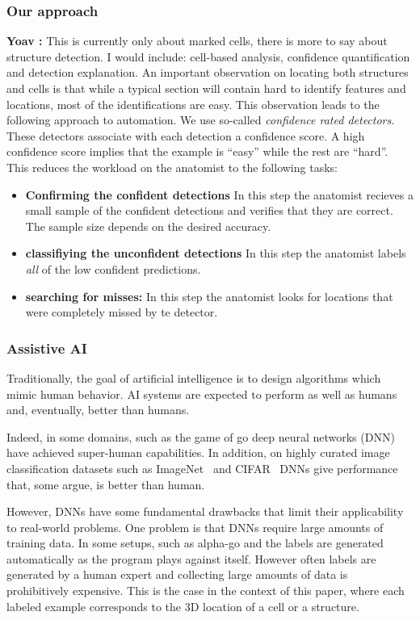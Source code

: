 \documentclass[11pt]{article}
\newcommand{\comment}[3]{{\color{#1} {\bf #2 :} #3}}
\newcommand{\yoav}[1]{\comment{purple}{Yoav}{#1}}
\begin{document}
\subsubsection{Our approach}

\yoav{This is currently only about marked cells, there is more to say about structure detection. I would include: cell-based analysis, confidence quantification and detection explanation.}
An important observation on locating both structures and cells is that while a typical section will contain hard to identify features and locations, most of the identifications are easy. This observation leads to the following approach to automation. We
use so-called {\em confidence rated detectors}. These detectors
associate with each detection a confidence score. A high confidence
score implies that the example is ``easy''  while the rest are
``hard''. This reduces the workload on the anatomist to the following
tasks:
\begin{itemize}
  \item {\bf Confirming the confident detections} In this step the
    anatomist recieves a small sample of the confident detections and
    verifies that they are correct. The sample size depends on the
    desired accuracy.
    \item {\bf classifiying the unconfident detections} In this step
      the anatomist labels {\em all} of the low confident predictions.
    \item {\bf searching for misses:} In this step the anatomist looks
      for locations that were completely missed by te detector.
  \end{itemize}
  
\subsubsection{Assistive AI} Traditionally, the goal of artificial
  intelligence is to design algorithms which mimic human behavior. AI
  systems are expected to perform as well as humans and, eventually,
  better than humans.

Indeed, in some domains, such as the game of go \cite{silver2017mastering} deep neural
networks (DNN)  have achieved super-human capabilities. In addition,
on highly curated image classification datasets such as ImageNet~\cite{deng2009imagenet} and
CIFAR~\cite{krizhevsky2009learning} DNNs give performance that, some argue, is better than
human. 

However, DNNs have some fundamental drawbacks that limit their
applicability to real-world problems. One problem is that DNNs
require large amounts of training data.
In some setups, such as alpha-go and the labels are generated automatically as
the program plays against itself. However often labels are generated by a
human expert and collecting large amounts of data is
prohibitively expensive. This is the case in the context of this
paper, where each labeled example corresponds to the 3D location of a
cell or a structure.
\end{document}
